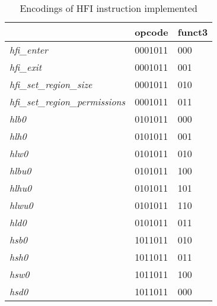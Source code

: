 \documentclass[conference,compsoc]{IEEEtran}
\begin{document}
\begin{table}[]
\caption{Encodings of HFI instruction implemented}
\label{tab:hfi_instructions}
\begin{tabular}{|l|l|l|}
\hline
                                         &  opcode   & funct3   \\ \hline
\textit{hfi\_enter}                      &  0001011  &  000     \\ \hline
\textit{hfi\_exit}                       &  0001011  &  001     \\ \hline
\textit{hfi\_set\_region\_size}          &  0001011  &  010     \\ \hline
\textit{hfi\_set\_region\_permissions}   &  0001011  &  011     \\ \hline
\textit{hlb0}                       &  0101011  &  000     \\ \hline
\textit{hlh0}                       &  0101011  &  001     \\ \hline
\textit{hlw0}                       &  0101011  &  010     \\ \hline
\textit{hlbu0}                      &  0101011  &  100     \\ \hline
\textit{hlhu0}                      &  0101011  &  101     \\ \hline
\textit{hlwu0}                      &  0101011  &  110     \\ \hline
\textit{hld0}                       &  0101011  &  011     \\ \hline
\textit{hsb0}                       &  1011011  &  010     \\ \hline
\textit{hsh0}                       &  1011011  &  011     \\ \hline
\textit{hsw0}                       &  1011011  &  100     \\ \hline
\textit{hsd0}                       &  1011011  &  000     \\ \hline
\end{tabular}
\end{table}
\end{document}
